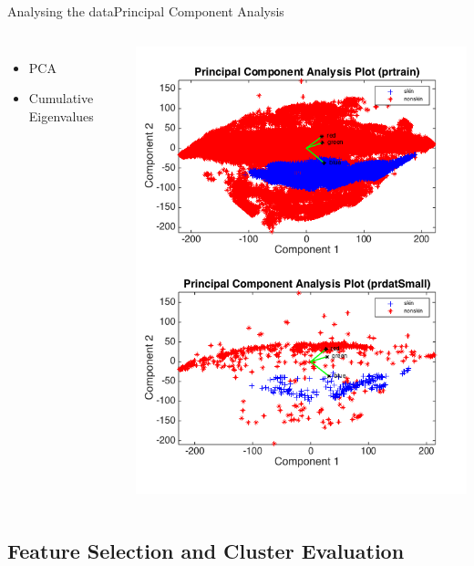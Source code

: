 \documentclass{beamer}
\begin{document}
\begin{frame}{Analysing the data}{Principal Component Analysis}
    \begin{columns}
    \begin{itemize}
        \item PCA
        \item Cumulative Eigenvalues
        
        
    \end{itemize}
        \includegraphics[scale=0.2]{PCAplot.png}
    \end{columns}
\end{frame}

\subsection{Feature Selection and Cluster Evaluation}
\end{document}
